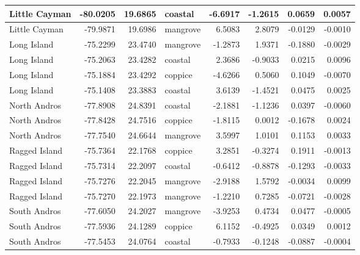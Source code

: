 \begin{tabular}{l|r|r|l|r|r|r|r}
\hline
Little Cayman & -80.0205 & 19.6865 & coastal & -6.6917 & -1.2615 & 0.0659 & 0.0057\\
\hline
Little Cayman & -79.9871 & 19.6986 & mangrove & 6.5083 & 2.8079 & -0.0129 & -0.0010\\
\hline
Long Island & -75.2299 & 23.4740 & mangrove & -1.2873 & 1.9371 & -0.1880 & -0.0029\\
\hline
Long Island & -75.2063 & 23.4282 & coastal & 2.3686 & -0.9033 & 0.0215 & 0.0096\\
\hline
Long Island & -75.1884 & 23.4292 & coppice & -4.6266 & 0.5060 & 0.1049 & -0.0070\\
\hline
Long Island & -75.1408 & 23.3883 & coastal & 3.6139 & -1.4521 & 0.0475 & 0.0025\\
\hline
North Andros & -77.8908 & 24.8391 & coastal & -2.1881 & -1.1236 & 0.0397 & -0.0060\\
\hline
North Andros & -77.8428 & 24.7516 & coppice & -1.8115 & 0.0012 & -0.1678 & 0.0024\\
\hline
North Andros & -77.7540 & 24.6644 & mangrove & 3.5997 & 1.0101 & 0.1153 & 0.0033\\
\hline
Ragged Island & -75.7364 & 22.1768 & coppice & 3.2851 & -0.3274 & 0.1911 & -0.0013\\
\hline
Ragged Island & -75.7314 & 22.2097 & coastal & -0.6412 & -0.8878 & -0.1293 & -0.0033\\
\hline
Ragged Island & -75.7276 & 22.2045 & mangrove & -2.9188 & 1.5792 & -0.0034 & 0.0099\\
\hline
Ragged Island & -75.7270 & 22.1973 & mangrove & -1.2210 & 0.7285 & -0.0721 & -0.0028\\
\hline
South Andros & -77.6050 & 24.2027 & mangrove & -3.9253 & 0.4734 & 0.0477 & -0.0005\\
\hline
South Andros & -77.5936 & 24.1289 & coppice & 6.1152 & -0.4925 & 0.0349 & 0.0012\\
\hline
South Andros & -77.5453 & 24.0764 & coastal & -0.7933 & -0.1248 & -0.0887 & -0.0004\\
\hline
\end{tabular}
